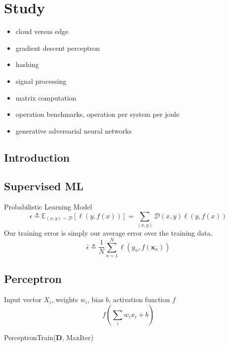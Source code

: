 \documentclass[main.tex]{subfiles}
\begin{document}
\section{Study}

\begin{itemize}
\item cloud versus edge
\item gradient descent
\itme perceptron
\item hashing
\item signal processing
\item matrix computation
\item operation benchmarks, operation per system per joule
\item generative adversarial neural networks
\end{itemize}

\subsection{Introduction}
\subsection{Supervised ML}
Probabilistic Learning Model
$$\epsilon \triangleq \mathbb{E}_{(x, y) \sim \mathcal{D}}[\ell(y, f(x))]=\sum_{(x, y)} \mathcal{D}(x, y) \ell(y, f(x))$$
Our training error is simply our average error over the training data. 
$$\hat{\epsilon} \triangleq \frac{1}{N} \sum_{n=1}^{N} \ell\left(y_{n}, f\left(\boldsymbol{x}_{n}\right)\right)$$

\subsection{Perceptron}
Input vector $X_i$, weights $w_i$, bias $b$, activation function $f$
$$f\left(\sum_{i} w_{i} x_{i}+b\right)$$

\begin{algorithm}
\caption{PerceptronTrain(\textbf{D}, MaxIter)}
\begin{algorithmic}[1]
\State $w_d \leftarrow 0, \text{ for all } d = 1 ... D$ 
\State $b \leftarrow 0$
        \State $a \leftarrow \sum_{d=1}^{D} w_d x_d +b$
        \If{$ya \leq 0$}{
            \State $w_d \leftarrow w_d + yx_d, \text{ for all } d = 1...D$
            \State $b \leftarrow b + y$
        \EndIf
    \EndFor
\EndFor
\State \Return $w_0, w_1, ..., w_D, b$
\end{algorithmic}
\end{algorithm}
\end{document}
